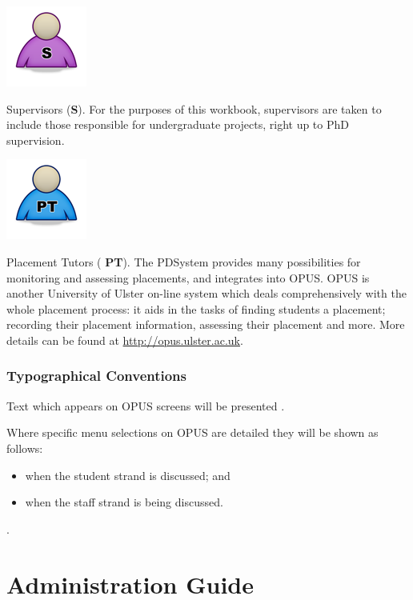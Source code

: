 \documentclass[12 pt]{book}
\begin{document}
\parbox{2 cm}{\includegraphics{png/icon_s.png}}
\parbox{9 cm}{Supervisors ({\bfseries S}). For the purposes
of this workbook, supervisors are taken to include those
responsible for undergraduate projects, right up to PhD
supervision.}
\medskip

\parbox{2 cm}{\includegraphics{png/icon_pt.png}}
\parbox{9 cm}{Placement Tutors ({\bfseries 
PT}). The PDSystem provides many possibilities for
monitoring and assessing placements, and integrates into
OPUS. OPUS is another University of Ulster on-line system
which deals comprehensively with the whole
placement process: it aids in the tasks of finding students
a placement; recording their placement information,
assessing their placement and more. More details can
be found at \url{http://opus.ulster.ac.uk}.}

\section{Typographical Conventions}

Text which appears on OPUS screens will be
presented .

Where specific menu selections on OPUS are detailed they will
be shown as follows: 
\begin{itemize}
\item {} when the student strand is discussed; and
\item {} when the staff strand is being discussed.
\end{itemize}

.

\part{Administration Guide}
\end{document}
